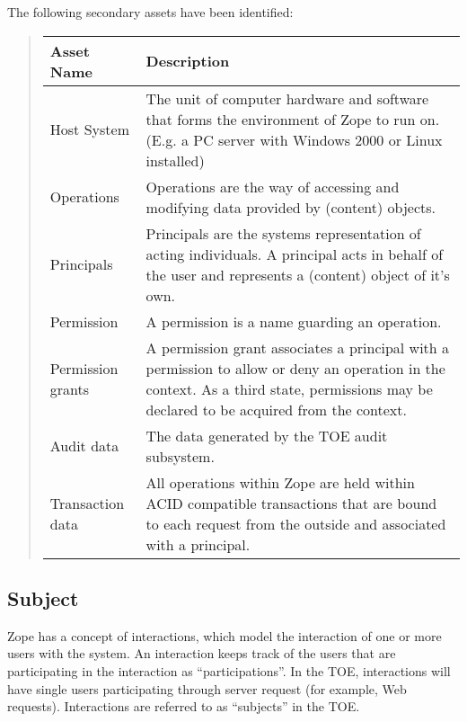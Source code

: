\documentclass[10pt,a4paper,english]{article}
\newlength{\locallinewidth}
\begin{document}
The following secondary assets have been identified:
\begin{quote}

\begin{longtable}[c]{|p{0.21\locallinewidth}|p{0.67\locallinewidth}|}
\hline
\textbf{
Asset Name
} & \textbf{
Description
} \\
\hline
\endhead

Host System
 & 
The unit of computer hardware and software that
forms the environment of Zope to run on. (E.g.
a PC server with Windows 2000 or Linux installed)
 \\
\hline

Operations
 & 
Operations are the way of accessing and modifying
data provided by (content) objects.
 \\
\hline

Principals
 & 
Principals are the systems representation of acting
individuals. A principal acts in behalf of the user
and represents a (content) object of it's own.
 \\
\hline

Permission
 & 
A permission is a name guarding an operation.
 \\
\hline

Permission grants
 & 
A permission grant associates a principal with a
permission to allow or deny an operation in the context.
As a third state, permissions may be declared to
be acquired from the context.
 \\
\hline

Audit data
 & 
The data generated by the TOE audit subsystem.
 \\
\hline

Transaction data
 & 
All operations within Zope are held within ACID
compatible transactions that are bound to each
request from the outside and associated with a
principal.
 \\
\hline
\end{longtable}
\end{quote}



\hypertarget{subject}{}
\subsection*{Subject}

Zope has a concept of interactions, which model the interaction of one
or more users with the system.  An interaction keeps track of the
users that are participating in the interaction as ``participations''.
In the TOE, interactions will have single users participating through
server request (for example, Web requests).  Interactions are referred
to as ``subjects'' in the TOE.
\end{document}
